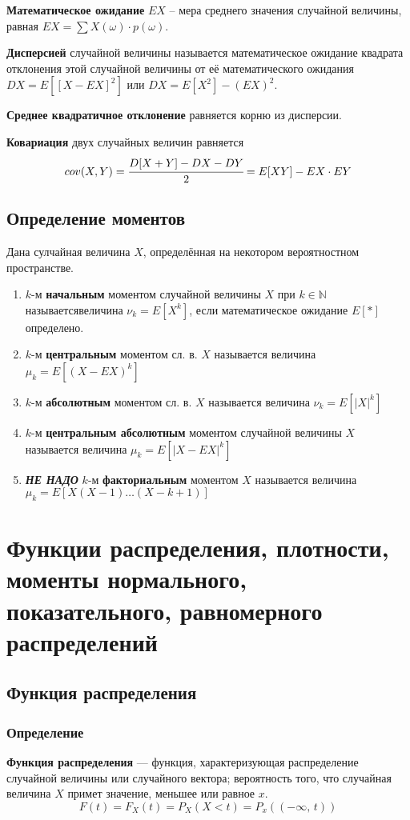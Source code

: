 \documentclass{article}
\newcommand{\numberset}[1]{\mathbb{#1}}
\newcommand{\N}{\numberset{N}}
\begin{document}
\textbf{Математическое ожидание} $EX$ -- мера среднего значения случайной величины, равная $EX=\sum X(\omega)\cdot p(\omega)$.

\textbf{Дисперсией} случайной величины называется математическое ожидание квадрата отклонения этой случайной величины от её математического ожидания $DX=E[[X-EX]^2]$ или $DX=E[X^2]-(EX)^2$.

\textbf{Среднее квадратичное отклонение} равняется корню из дисперсии.

\textbf{Ковариация} двух случайных величин равняется $$cov(X,Y)=\cfrac{D[X+Y]-DX-DY}{2}=E[XY]-EX\cdot EY$$
\subsection{Определение моментов}
Дана сулчайная величина $X$, определённая на некотором вероятностном пространстве.
\begin{enumerate}
    \item $k$-м \textbf{начальным} моментом случайной величины $X$ при $k\in\N$ называется\quad величина $\nu_k=E[X^k]$, если математическое ожидание $E[*]$ определено.
    \item $k$-м \textbf{центральным} моментом сл. в. $X$ называется величина $\mu_k=E[(X-EX)^k]$
    \item $k$-м \textbf{абсолютным} моментом сл. в. $X$ называется величина $\nu_k=E[|X|^k]$
    \item $k$-м \textbf{центральным абсолютным} моментом случайной величины $X$ называется величина $\mu_k=E[|X-EX|^k]$
    \item \textbf{\textit{НЕ НАДО}} $k$-м \textbf{факториальным} моментом $X$ называется величина $\mu_k=E[X(X-1)\dots (X-k+1)]$
\end{enumerate}
\newpage
\section{Функции распределения, плотности, моменты нормального, показательного, равномерного распределений}
\subsection{Функция распределения}
\subsubsection{Определение}
\textbf{Функция распределения} — функция, характеризующая распределение случайной величины или случайного вектора; вероятность того, что случайная величина $X$ примет значение, меньшее или равное $x$.
$$ F(t)=F_X(t)=P_X(X<t)=P_x((-\infty,\,t)) $$
\end{document}
